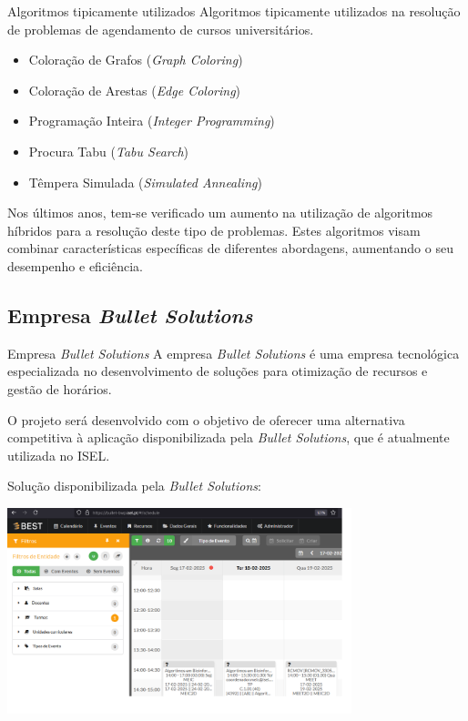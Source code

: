 \documentclass[11]{beamer}
\begin{document}
    \begin{frame}{Algoritmos tipicamente utilizados}
        \justifying
        Algoritmos tipicamente utilizados na resolução de problemas de agendamento de cursos universitários. 
        \begin{itemize}
            \item Coloração de Grafos (\textit{Graph Coloring})
            \item Coloração de Arestas (\textit{Edge Coloring})
            \item Programação Inteira (\textit{Integer Programming})
            \item Procura Tabu (\textit{Tabu Search})
            \item Têmpera Simulada (\textit{Simulated Annealing})
        \end{itemize}

        Nos últimos anos, tem-se verificado um aumento na utilização de algoritmos híbridos para a resolução deste tipo de problemas. Estes algoritmos visam combinar características específicas de diferentes abordagens, aumentando o seu desempenho e eficiência.
    \end{frame}

    \subsection{Empresa \textit{Bullet Solutions}}

    \begin{frame}{Empresa \textit{Bullet Solutions}}
        \justifying
        A empresa \textit{Bullet Solutions} é uma empresa tecnológica especializada no desenvolvimento de soluções para otimização de recursos e gestão de horários.

        O projeto será desenvolvido com o objetivo de oferecer uma alternativa competitiva à aplicação disponibilizada pela \textit{Bullet Solutions}, que é atualmente utilizada no ISEL.
    \end{frame}

    \begin{frame}
        \justifying
        Solução disponibilizada pela \textit{Bullet Solutions}:
        \begin{center}
            \includegraphics[width=10cm]{img/exemplo-bullet-solutions-software.png}
        \end{center}
    \end{frame}
\end{document}
